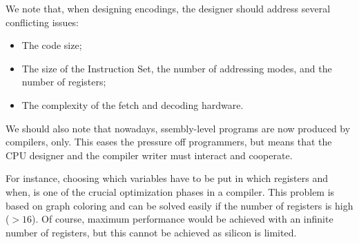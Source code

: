 \documentclass[a4paper,11pt]{article}
\begin{document}
\begin{figure}[H]
\end{figure}

We note that, when designing encodings, the designer should address several conflicting issues:
\begin{itemize}
	\item The code size;
	\item The size of the Instruction Set, the number of addressing modes, and the number of registers;
	\item The complexity of the fetch and decoding hardware.
\end{itemize}

We should also note that nowadays, ssembly-level programs are now produced by compilers, only.
This eases the pressure off programmers, but means that the CPU designer and the compiler writer must interact and cooperate.

For instance, choosing which variables have to be put in which registers and when, is one of the crucial optimization phases in a compiler.
This problem is based on graph coloring and can be solved easily if the number of registers is high ($>16$).
Of course, maximum performance would be achieved with an infinite number of registers, but this cannot be achieved as silicon is limited.
\end{document}
